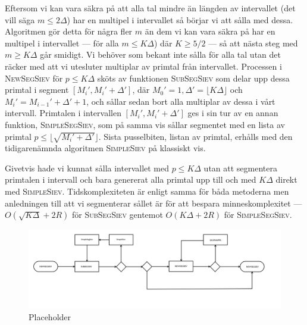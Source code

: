 Eftersom vi kan vara säkra på att alla tal mindre än längden av intervallet (det vill säga \(m \leq 2 \Delta\)) har en multipel i intervallet så börjar vi att sålla med dessa. Algoritmen gör detta för några fler \(m\) än dem vi kan vara säkra på har en multipel i intervallet --- för alla \(m \leq K \Delta\)) där \(K \geq 5/2\) --- så att nästa steg med \(m \geq K \Delta\) går smidigt. Vi behöver som bekant inte sålla för alla tal utan det räcker med att vi utesluter multiplar av primtal från intervallet. Processen i \textsc{NewSegSiev} för \(p \leq K \Delta\) sköts av funktionen \textsc{SubSegSiev} som delar upp dessa primtal i segment \([M_i', M_i' + \Delta']\), där \(M_0' = 1, \Delta' = \lfloor K \Delta \rfloor\) och \(M_i' = M_{i-1}' + \Delta' + 1\), och sållar sedan bort alla multiplar av dessa i vårt intervall. Primtalen i intervallen \([M_i', M_i' + \Delta']\) ges i sin tur av en annan funktion, \textsc{SimpleSegSiev}, som på samma vis sållar segmentet med en lista av primtal \(p \leq \lfloor\sqrt{M_i' + \Delta'}\rfloor\). Sista pusselbiten, listan av primtal, erhålls med den tidigarenämnda algoritmen \textsc{SimpleSiev} på klassiskt vis. 

Givetvis hade vi kunnat sålla intervallet med \(p \leq K \Delta\) utan att segmentera primtalen i intervall och bara genererat alla primtal upp till och med \(K \Delta\) direkt med \textsc{SimpleSiev}. Tidskomplexiteten är enligt \cite{HaraldSieve} samma för båda metoderna men anledningen till att vi segmenterar sållet är för att bespara minneskomplexitet --- \(O(\sqrt{K \Delta} + 2R)\) för \textsc{SubSegSiev} gentemot \(O(K \Delta + 2R)\) för \textsc{SimpleSegSiev}. 


\begin{figure}
    \centering
    \includegraphics[width = \textwidth]{erik/Images/flowchart.png}
    \caption{Placeholder}
    \label{fig:flowchart}
\end{figure}

